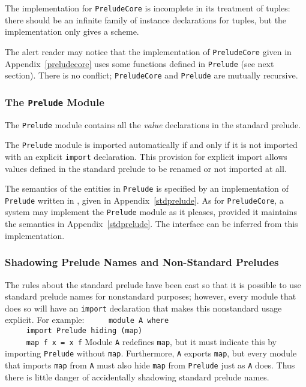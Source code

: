 The implementation for \mbox{\tt PreludeCore} is incomplete in its
treatment of tuples: there should be an infinite family of instance
declarations for tuples, but the implementation only gives a scheme.

The alert reader may notice that the implementation of
\mbox{\tt PreludeCore} given in Appendix~\ref{preludecore} uses
some functions defined in \mbox{\tt Prelude} (see next section).  There is no
conflict; \mbox{\tt PreludeCore} and \mbox{\tt Prelude} are mutually
recursive.

\subsubsection{The \mbox{\tt Prelude} Module}

The \mbox{\tt Prelude} module contains all the {\em value} declarations
in the standard prelude.

The \mbox{\tt Prelude} module is imported automatically if and only if it is
not imported with an explicit \mbox{\tt import} declaration.  This provision
for explicit import allows values defined in the standard prelude to
be renamed or not imported at all.

The semantics of the entities in \mbox{\tt Prelude} is specified by
an implementation of \mbox{\tt Prelude} written in \Haskell{}, given in
Appendix~\ref{stdprelude}.  As for \mbox{\tt PreludeCore},
a \Haskell{} system may implement the \mbox{\tt Prelude} module
as it pleases, provided it maintains the semantics in
Appendix~\ref{stdprelude}.  The interface can be inferred
from this implementation.

\subsubsection{Shadowing Prelude Names and Non-Standard Preludes}
\label{std-prel-shadowing}

The rules about the standard prelude have been cast so that it is
possible to use standard prelude names for nonstandard purposes; however,
every module that does so will have an \mbox{\tt import} declaration
that makes this nonstandard usage explicit.  For example:
\bprog
\mbox{\tt \ \ \ \ \ module\ A\ where}\\
\mbox{\tt \ \ \ \ \ import\ Prelude\ hiding\ (map)}\\
\mbox{\tt \ \ \ \ \ map\ f\ x\ =\ x\ f}
\eprog
Module \mbox{\tt A} redefines \mbox{\tt map}, but it must indicate this by
importing \mbox{\tt Prelude} without \mbox{\tt map}.  Furthermore, \mbox{\tt A} exports \mbox{\tt map},
but every module that imports \mbox{\tt map} from \mbox{\tt A} must also hide
\mbox{\tt map} from \mbox{\tt Prelude} just as \mbox{\tt A} does.  Thus there is little danger of accidentally
shadowing standard prelude names.

